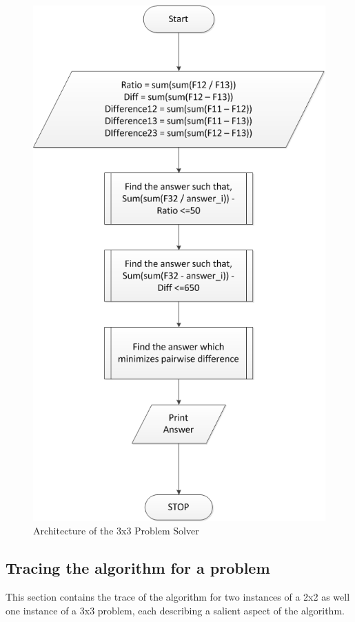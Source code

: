 \documentclass[10pt, letter]{article}
\begin{document}
\begin{figure}[h!]
  \centering
    \includegraphics[scale = 0.35]{Images/Fig8}
    \caption{Architecture of the 3x3 Problem Solver}
  \label{fig8}
\end{figure}


\subsection*{Tracing the algorithm for a problem}
This section contains the trace of the algorithm for two instances of a 2x2 as well one instance of a 3x3 problem, each describing a salient aspect of the algorithm.
\end{document}
